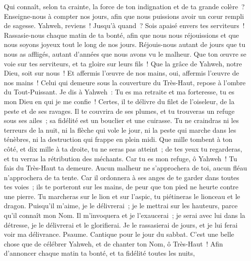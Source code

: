 \begin{multicols}{2}
Qui connaît, selon ta crainte, la force de ton indignation et de ta grande colère~?
Enseigne-nous à compter nos jours, afin que nous puissions avoir un cœur rempli de sagesse.
Yahweh, reviens~! Jusqu'à quand~? Sois apaisé envers tes serviteurs~!
Rassasie-nous chaque matin de ta bonté, afin que nous nous réjouissions et que nous soyons joyeux tout le long de nos jours.
Réjouis-nous autant de jours que tu nous as affligés, autant d'années que nous avons vu le malheur.
Que ton œuvre se voie sur tes serviteurs, et ta gloire sur leurs fils~!
Que la grâce de Yahweh, notre Dieu, soit sur nous~! Et affermis l'œuvre de nos mains, oui, affermis l'œuvre de nos mains~!
\VerseOne{}Celui qui demeure sous la couverture du Très-Haut, repose à l'ombre du Tout-Puissant.
Je dis à Yahweh~: Tu es ma retraite et ma forteresse, tu es mon Dieu en qui je me confie~!
Certes, il te délivre du filet de l'oiseleur, de la peste et de ses ravages.
Il te couvrira de ses plumes, et tu trouveras un refuge sous ses ailes~; sa fidélité est un bouclier et une cuirasse.
Tu ne craindras ni les terreurs de la nuit, ni la flèche qui vole le jour,
ni la peste qui marche dans les ténèbres, ni la destruction qui frappe en plein midi.
Que mille tombent à ton côté, et dix mille à ta droite, tu ne seras pas atteint~;
de tes yeux tu regarderas, et tu verras la rétribution des méchants.
Car tu es mon refuge, ô Yahweh~! Tu fais du Très-Haut ta demeure.
Aucun malheur ne s'approchera de toi, aucun fléau n'approchera de ta tente.
Car il ordonnera à ses anges de te garder dans toutes tes voies~;
ils te porteront sur les mains, de peur que ton pied ne heurte contre une pierre.
Tu marcheras sur le lion et sur l'aspic, tu piétineras le lionceau et le dragon.
Puisqu'il m'aime, je le délivrerai~; je le mettrai sur les hauteurs, parce qu'il connaît mon Nom.
Il m'invoquera et je l'exaucerai~; je serai avec lui dans la détresse, je le délivrerai et le glorifierai.
Je le rassasierai de jours, et je lui ferai voir ma délivrance.
\VerseOne{}Psaume. Cantique pour le jour du sabbat.
C'est une belle chose que de célébrer Yahweh, et de chanter ton Nom, ô Très-Haut~!
Afin d'annoncer chaque matin ta bonté, et ta fidélité toutes les nuits,

\end{multicols}
